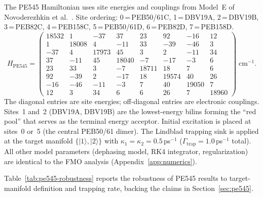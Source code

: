 \documentclass[12pt,a4paper]{article}
\theoremstyle{definition}
\theoremstyle{remark}
\begin{document}
The PE545 Hamiltonian uses site energies and couplings from Model~E of Novoderezhkin et al.\ \cite{novoderezhkin2010excitation}. Site ordering: 0\,=\,PEB50/61C, 1\,=\,DBV19A, 2\,=\,DBV19B, 3\,=\,PEB82C, 4\,=\,PEB158C, 5\,=\,PEB50/61D, 6\,=\,PEB82D, 7\,=\,PEB158D.
\begin{equation}
\label{eq:pe545-hamiltonian}
H_{\mathrm{PE545}} = \begin{pmatrix}
18532 &    1 &  -37 &   37 &   23 &   92 &  -16 &   12 \\
    1 & 18008 &    4 &  -11 &   33 &  -39 &  -46 &    3 \\
  -37 &    4 & 17973 &   45 &    3 &    2 &  -11 &   34 \\
   37 &  -11 &   45 & 18040 &   -7 &  -17 &   -3 &    6 \\
   23 &   33 &    3 &   -7 & 18711 &   18 &    7 &    6 \\
   92 &  -39 &    2 &  -17 &   18 & 19574 &   40 &   26 \\
  -16 &  -46 &  -11 &   -3 &    7 &   40 & 19050 &    7 \\
   12 &    3 &   34 &    6 &    6 &   26 &    7 & 18960
\end{pmatrix}\;\mathrm{cm}^{-1}.
\end{equation}
The diagonal entries are site energies; off-diagonal entries are electronic couplings. Sites~1 and~2 (DBV19A, DBV19B) are the lowest-energy bilins forming the ``red pool'' that serves as the terminal energy acceptor. Initial excitation is placed at sites~0 or~5 (the central PEB50/61 dimer). The Lindblad trapping sink is applied at the target manifold $\{|1\rangle, |2\rangle\}$ with $\kappa_1 = \kappa_2 = 0.5$\,ps$^{-1}$ ($\Gamma_{\mathrm{trap}} = 1.0$\,ps$^{-1}$ total). All other model parameters (dephasing model, RK4 integrator, regularization) are identical to the FMO analysis (Appendix~\ref{app:numerics}).

Table~\ref{tab:pe545-robustness} reports the robustness of PE545 results to target-manifold definition and trapping rate, backing the claims in Section~\ref{sec:pe545}.
\end{document}
